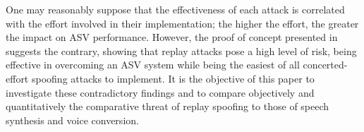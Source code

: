 One may reasonably suppose that the effectiveness of each attack is correlated with the effort involved in their implementation; the higher the effort, the greater the impact on ASV performance. However, the proof of concept presented in~\cite{Alegre2014} suggests the contrary, showing that replay attacks pose a high level of risk, being effective in overcoming an ASV system while being the easiest of all concerted-effort spoofing attacks to implement.  It is the objective of this paper to investigate these contradictory findings and to compare objectively and quantitatively the comparative threat of replay spoofing to those of speech synthesis and voice conversion.
